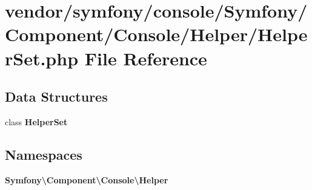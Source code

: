 \section{vendor/symfony/console/\+Symfony/\+Component/\+Console/\+Helper/\+Helper\+Set.php File Reference}
\label{_helper_set_8php}
\subsection*{Data Structures}
\begin{DoxyCompactItemize}
\item 
class {\bf Helper\+Set}
\end{DoxyCompactItemize}
\subsection*{Namespaces}
\begin{DoxyCompactItemize}
\item 
 {\bf Symfony\textbackslash{}\+Component\textbackslash{}\+Console\textbackslash{}\+Helper}
\end{DoxyCompactItemize}
